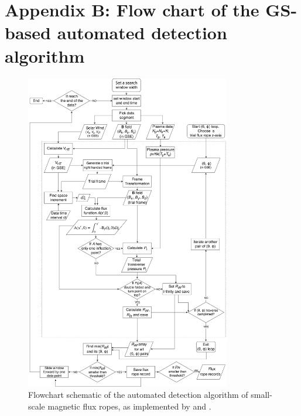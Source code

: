\chapter{Appendix B: Flow chart of the GS-based automated detection algorithm}\label{appendix:gs-flowchart}

\renewcommand{\thechapter}{B}
\renewcommand{\thefigure}{B.\arabic{figure}}
\setcounter{figure}{0}

\begin{figure}
    \centering
    \includegraphics[width=0.8\textwidth]{Figures/fluxrope_algorithm.jpg}
    \caption[Flowchart of GS-reconstruction based automated detection algorithm]{Flowchart schematic of the automated detection algorithm of small-scale magnetic flux ropes, as implemented by \cite{Hu:2018} and \cite{Zheng:2018}.}
    \label{fig:flowchart}
\end{figure}